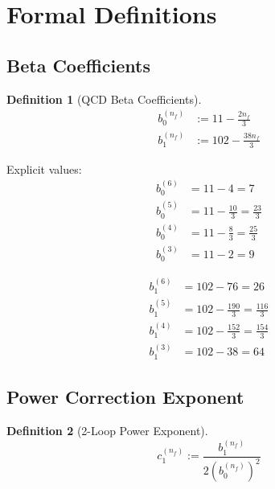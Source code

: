 \documentclass[11pt,a4paper]{article}
\theoremstyle{definition}
\newtheorem{definition}{Definition}[section]
\begin{document}
\section{Formal Definitions}
\label{sec:definitions}

\subsection{Beta Coefficients}
\label{subsec:beta-coeffs}

\begin{definition}[QCD Beta Coefficients]
\label{def:beta-coeffs}
\begin{align}
\label{eq:b0-def}
b_0^{(n_f)} &:= 11 - \frac{2n_f}{3} \\
\label{eq:b1-def}
b_1^{(n_f)} &:= 102 - \frac{38n_f}{3}
\end{align}
\end{definition}

Explicit values:
\begin{align}
\label{eq:b0-6}
b_0^{(6)} &= 11 - 4 = 7 \\
\label{eq:b0-5}
b_0^{(5)} &= 11 - \frac{10}{3} = \frac{23}{3} \\
\label{eq:b0-4}
b_0^{(4)} &= 11 - \frac{8}{3} = \frac{25}{3} \\
\label{eq:b0-3}
b_0^{(3)} &= 11 - 2 = 9
\end{align}

\begin{align}
\label{eq:b1-6}
b_1^{(6)} &= 102 - 76 = 26 \\
\label{eq:b1-5}
b_1^{(5)} &= 102 - \frac{190}{3} = \frac{116}{3} \\
\label{eq:b1-4}
b_1^{(4)} &= 102 - \frac{152}{3} = \frac{154}{3} \\
\label{eq:b1-3}
b_1^{(3)} &= 102 - 38 = 64
\end{align}

\subsection{Power Correction Exponent}
\label{subsec:c1-def}

\begin{definition}[2-Loop Power Exponent]
\label{def:c1}
\begin{equation}
\label{eq:c1-def}
\boxed{c_1^{(n_f)} := \frac{b_1^{(n_f)}}{2(b_0^{(n_f)})^2}}
\end{equation}
\end{definition}
\end{document}
